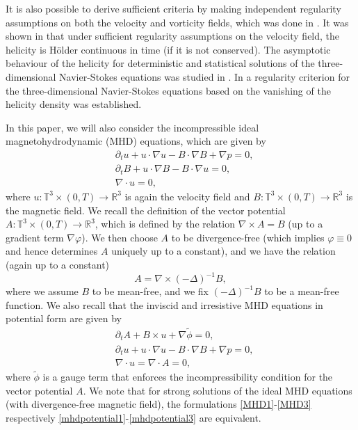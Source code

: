 \documentclass[12pt,a4paper]{article}
\theoremstyle{definition}
\theoremstyle{remark}
\numberwithin{equation}{section}
\begin{document}
It is also possible to derive sufficient criteria by making independent regularity assumptions on both the velocity and vorticity fields, which was done in \cite{derosa,wangcompressible}. It was shown in \cite{derosa,liuholder} that under sufficient regularity assumptions on the velocity field, the helicity is H\"older continuous in time (if it is not conserved). The asymptotic behaviour of the helicity for deterministic and statistical solutions of the three-dimensional Navier-Stokes equations was studied in \cite{foias2007,foias2009}. In \cite{berselli2009} a regularity criterion for the three-dimensional Navier-Stokes equations based on the vanishing of the helicity density was established.

In this paper, we will also consider the incompressible ideal magnetohydrodynamic (MHD) equations, which are given by
\begin{align}
&\partial_t u + u \cdot \nabla u - B \cdot \nabla B + \nabla p = 0, \label{MHD1} \\ 
&\partial_t B + u \cdot \nabla B - B \cdot \nabla u = 0, \label{MHD2} \\
&\nabla \cdot u = 0, \label{MHD3}
\end{align}
where $u: \mathbb{T}^3 \times (0,T) \rightarrow \mathbb{R}^3 $ is again the velocity field and $B : \mathbb{T}^3 \times (0,T) \rightarrow \mathbb{R}^3$ is the magnetic field. We recall the definition of the vector potential $A : \mathbb{T}^3 \times (0,T) \rightarrow \mathbb{R}^3$, which is defined by the relation $\nabla \times A = B$ (up to a gradient term $\nabla \varphi$). We then choose $A$ to be divergence-free (which implies $\varphi \equiv 0$ and hence determines $A$ uniquely up to a constant), and we have the relation (again up to a constant)
\begin{equation} \label{potentialequation}
A = \nabla \times (-\Delta)^{-1} B,
\end{equation}
where we assume $B$ to be mean-free, and we fix $(-\Delta)^{-1} B$ to be a mean-free function. We also recall that the inviscid and irresistive MHD equations in potential form are given by
\begin{align}
&\partial_t A + B \times u + \nabla \tilde{\phi} = 0, \label{mhdpotential1} \\
&\partial_t u + u \cdot \nabla u - B \cdot \nabla B + \nabla p = 0, \label{mhdpotential2} \\
&\nabla \cdot u = \nabla \cdot A = 0, \label{mhdpotential3}
\end{align}
where $\tilde{\phi}$ is a gauge term that enforces the incompressibility condition for the vector potential $A$. We note that for strong solutions of the ideal MHD equations (with divergence-free magnetic field), the formulations \eqref{MHD1}-\eqref{MHD3} respectively \eqref{mhdpotential1}-\eqref{mhdpotential3} are equivalent.
\end{document}
